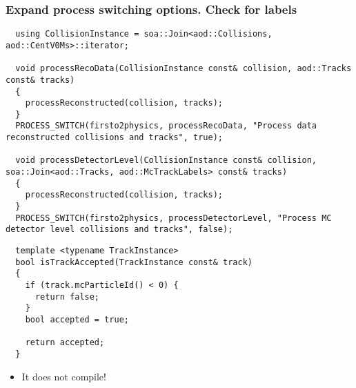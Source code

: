 \documentclass[14pt,aspectratio=169,t]{beamer}
\begin{document}
\begin{frame}[fragile]
  \frametitle{Expand process switching options. Check for labels}
  {\tiny\color{blue}
  \vspace{-0.1in}
  \begin{verbatim}
  using CollisionInstance = soa::Join<aod::Collisions, aod::CentV0Ms>::iterator;

  void processRecoData(CollisionInstance const& collision, aod::Tracks const& tracks)
  {
    processReconstructed(collision, tracks);
  }
  PROCESS_SWITCH(firsto2physics, processRecoData, "Process data reconstructed collisions and tracks", true);

  void processDetectorLevel(CollisionInstance const& collision, soa::Join<aod::Tracks, aod::McTrackLabels> const& tracks)
  {
    processReconstructed(collision, tracks);
  }
  PROCESS_SWITCH(firsto2physics, processDetectorLevel, "Process MC detector level collisions and tracks", false);
  \end{verbatim}}
  {\tiny\color{blue}
  \vspace{-0.4in}
  \begin{verbatim}
  template <typename TrackInstance>
  bool isTrackAccepted(TrackInstance const& track)
  {
    if (track.mcParticleId() < 0) {
      return false;
    }
    bool accepted = true;

    return accepted;
  }
  \end{verbatim}}
  \vspace{-0.4in}
  \begin{itemize}
    \small
    \item It does not compile!
  \end{itemize}
\end{frame}
\end{document}
